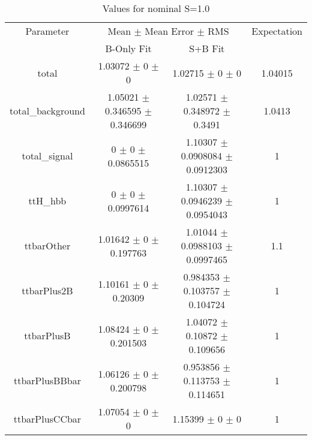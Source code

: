 \begin{table}
\centering
\caption{Values for nominal S=1.0}
\begin{tabular}{cccc}
\toprule
Parameter & \multicolumn{2}{c}{Mean $\pm$ Mean Error $\pm$ RMS} & Expectation\\
 & B-Only Fit & S+B Fit & \\
\midrule
total & \num{1.03072} $\pm$ \num{0} $\pm$ \num{0} & \num{1.02715} $\pm$ \num{0} $\pm$ \num{0} & \num{1.04015}\\
total\_background & \num{1.05021} $\pm$ \num{0.346595} $\pm$ \num{0.346699} & \num{1.02571} $\pm$ \num{0.348972} $\pm$ \num{0.3491} & \num{1.0413}\\
total\_signal & \num{0} $\pm$ \num{0} $\pm$ \num{0.0865515} & \num{1.10307} $\pm$ \num{0.0908084} $\pm$ \num{0.0912303} & \num{1}\\
ttH\_hbb & \num{0} $\pm$ \num{0} $\pm$ \num{0.0997614} & \num{1.10307} $\pm$ \num{0.0946239} $\pm$ \num{0.0954043} & \num{1}\\
ttbarOther & \num{1.01642} $\pm$ \num{0} $\pm$ \num{0.197763} & \num{1.01044} $\pm$ \num{0.0988103} $\pm$ \num{0.0997465} & \num{1.1}\\
ttbarPlus2B & \num{1.10161} $\pm$ \num{0} $\pm$ \num{0.20309} & \num{0.984353} $\pm$ \num{0.103757} $\pm$ \num{0.104724} & \num{1}\\
ttbarPlusB & \num{1.08424} $\pm$ \num{0} $\pm$ \num{0.201503} & \num{1.04072} $\pm$ \num{0.10872} $\pm$ \num{0.109656} & \num{1}\\
ttbarPlusBBbar & \num{1.06126} $\pm$ \num{0} $\pm$ \num{0.200798} & \num{0.953856} $\pm$ \num{0.113753} $\pm$ \num{0.114651} & \num{1}\\
ttbarPlusCCbar & \num{1.07054} $\pm$ \num{0} $\pm$ \num{0} & \num{1.15399} $\pm$ \num{0} $\pm$ \num{0} & \num{1}\\
\bottomrule
\end{tabular}
\end{table}